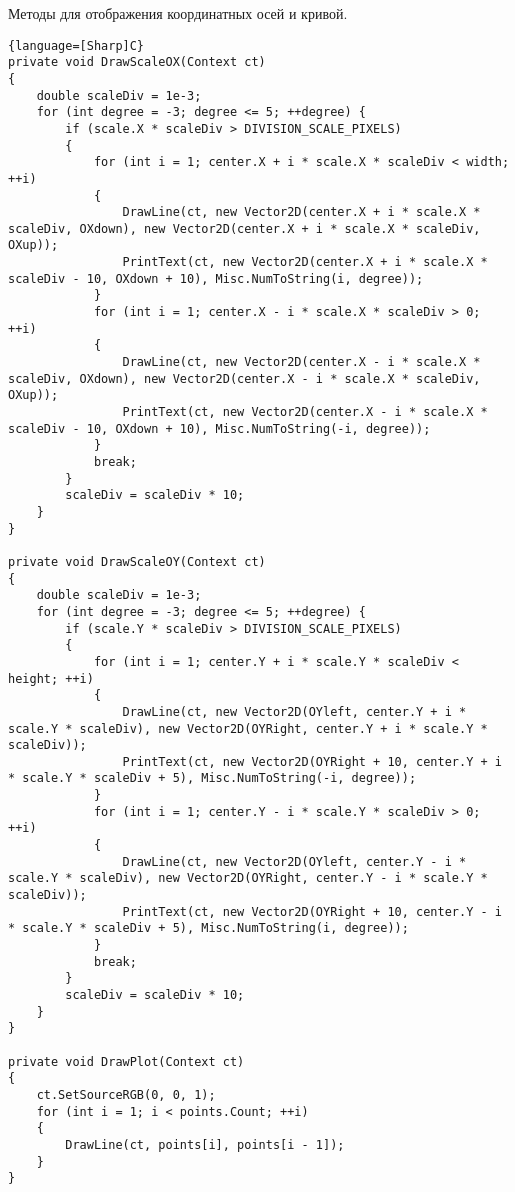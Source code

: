 Методы для отображения координатных осей и кривой.
\begin{lstlisting}{language=[Sharp]C}
private void DrawScaleOX(Context ct)
{
    double scaleDiv = 1e-3;
    for (int degree = -3; degree <= 5; ++degree) {
        if (scale.X * scaleDiv > DIVISION_SCALE_PIXELS)
        {
            for (int i = 1; center.X + i * scale.X * scaleDiv < width; ++i)
            {
                DrawLine(ct, new Vector2D(center.X + i * scale.X * scaleDiv, OXdown), new Vector2D(center.X + i * scale.X * scaleDiv, OXup));
                PrintText(ct, new Vector2D(center.X + i * scale.X * scaleDiv - 10, OXdown + 10), Misc.NumToString(i, degree));
            }
            for (int i = 1; center.X - i * scale.X * scaleDiv > 0; ++i)
            {
                DrawLine(ct, new Vector2D(center.X - i * scale.X * scaleDiv, OXdown), new Vector2D(center.X - i * scale.X * scaleDiv, OXup));
                PrintText(ct, new Vector2D(center.X - i * scale.X * scaleDiv - 10, OXdown + 10), Misc.NumToString(-i, degree));
            }
            break;
        }
        scaleDiv = scaleDiv * 10;
    }
}

private void DrawScaleOY(Context ct)
{
    double scaleDiv = 1e-3;
    for (int degree = -3; degree <= 5; ++degree) {
        if (scale.Y * scaleDiv > DIVISION_SCALE_PIXELS)
        {
            for (int i = 1; center.Y + i * scale.Y * scaleDiv < height; ++i)
            {
                DrawLine(ct, new Vector2D(OYleft, center.Y + i * scale.Y * scaleDiv), new Vector2D(OYRight, center.Y + i * scale.Y * scaleDiv));
                PrintText(ct, new Vector2D(OYRight + 10, center.Y + i * scale.Y * scaleDiv + 5), Misc.NumToString(-i, degree));
            }
            for (int i = 1; center.Y - i * scale.Y * scaleDiv > 0; ++i)
            {
                DrawLine(ct, new Vector2D(OYleft, center.Y - i * scale.Y * scaleDiv), new Vector2D(OYRight, center.Y - i * scale.Y * scaleDiv));
                PrintText(ct, new Vector2D(OYRight + 10, center.Y - i * scale.Y * scaleDiv + 5), Misc.NumToString(i, degree));
            }
            break;
        }
        scaleDiv = scaleDiv * 10;
    }
}

private void DrawPlot(Context ct)
{
    ct.SetSourceRGB(0, 0, 1);
    for (int i = 1; i < points.Count; ++i)
    {
        DrawLine(ct, points[i], points[i - 1]);
    }
}
\end{lstlisting}
\pagebreak
